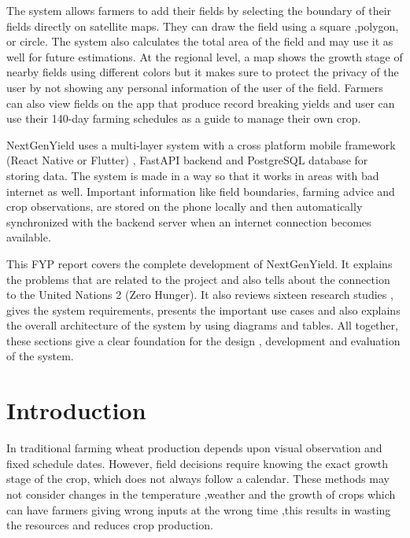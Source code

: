 \documentclass{FastFyp}
\begin{document}
The system allows farmers to add their fields by selecting the boundary of their fields directly on satellite maps. They can draw the field using a square ,polygon, or circle. The system also calculates the total area of the field and may use it as well for future estimations. At the regional level, a map shows the growth stage of nearby fields using different colors but it makes sure to protect the privacy of the user by not showing any personal information of the user of the field. Farmers can also view fields on the app that produce record breaking yields and user can use their 140-day farming schedules as a guide to manage their own crop.

NextGenYield uses a multi-layer system with a cross platform mobile framework (React Native or Flutter) , FastAPI backend and PostgreSQL database for storing data. The system is made in a way so that it works in areas with bad internet as well. Important information like field boundaries, farming advice and crop observations, are stored on the phone locally and then automatically synchronized with the backend server when an internet connection becomes available.

This FYP report covers the complete development of NextGenYield. It explains the problems that are related to the project and also tells about the connection to the United Nations 2 (Zero Hunger). It also reviews sixteen research studies , gives the system requirements, presents the important use cases and also explains the overall architecture of the system by using diagrams and tables. All together, these sections give a clear foundation for the design , development and evaluation of the system. 

\pagebreak


\pagestyle{fancy} %
\tableofcontents

\pagebreak
\listoffigures	%
\pagebreak
\listoftables %

\mainmatter


\chapter{Introduction}
In traditional farming wheat production depends upon visual observation and fixed schedule dates. However, field decisions require knowing the exact growth stage of the crop, which does not always follow a calendar. These methods may not consider changes in the temperature ,weather and the growth of crops which can have farmers giving wrong inputs at the wrong time ,this results in wasting the resources and reduces crop production.
\end{document}
